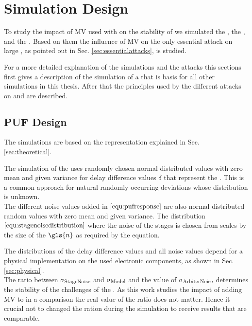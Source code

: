 \chapter{Simulation Design}
\label{cap:simulationdesign}

To study the impact of \ac{MV} used with \apufs on the stability of \apuf we simulated the \apuf, the \mpuf, and the \mxpuf.
Based on them the influence of \ac{MV} on the only essential attack on large \xpufs, as pointed out in Sec. \ref{sec:essentialattacks}, is studied.


For a more detailed explanation of the simulations and the attacks this sections first gives a description of the simulation of a \apuf that is basis for all other \puf simulations in this thesis.
After that the principles used by the different attacks on \mpufs and \mxpufs are described.



\section{\ac{PUF} Design}
\label{sec:pufsimulation}

The \apuf simulations are based on the \apuf representation explained in Sec. \ref{sec:theoretical}.

The simulation of the \apuf uses randomly chosen normal distributed values with zero mean and given variance for delay difference values $\delta$ that represent the \apuf.
This is a common approach for natural randomly occurring deviations whose distribution is unknown.\\
The different noise values added in $\ref{equ:pufresponse}$ are also normal distributed random values with zero mean and given variance.
The distribution $\ref{equ:stagenoisedistribution}$ where the noise of the stages is chosen from scales by the size of the \apuf $\gls{n}$ as required by the equation.

The distributions of the delay difference values and all noise values depend for a physical \apuf implementation on the used electronic components, as shown in Sec. \ref{sec:physical}.\\
The ratio between $\sigma_{\mathrm{Stage Noise}}$ and $\sigma_{\mathrm{Model}}$ and the value of $\sigma_{\mathrm{Arbiter Noise}}$ determines the stability of the challenges of the \apuf.
As this work studies the impact of adding \ac{MV} to \apufs in a comparison the real value of the ratio does not matter.
Hence it crucial not to changed the ration during the simulation to receive results that are comparable.

